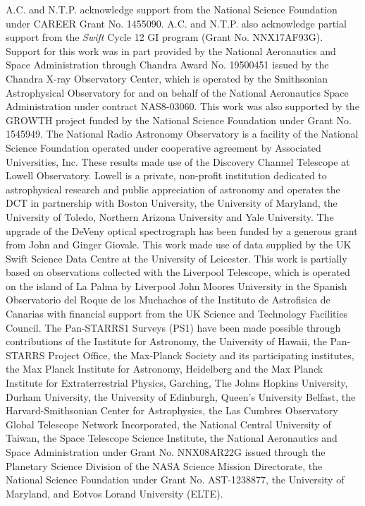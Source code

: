 \documentclass[twocolumn]{emulateapj}
\begin{document}
 
\acknowledgments \small
A.C. and N.T.P. acknowledge support from the National Science Foundation under CAREER Grant No. 1455090. A.C. and N.T.P. also acknowledge partial support from the 
\textit{Swift} Cycle 12 GI program (Grant No. NNX17AF93G). Support for this work was in part provided by 
the National Aeronautics and Space Administration through Chandra Award No. 19500451 issued 
by the Chandra X-ray Observatory Center, which is operated by the Smithsonian Astrophysical Observatory 
for and on behalf of the National Aeronautics Space Administration under contract NAS8-03060. 
This work was also supported by the GROWTH project funded by the National Science Foundation under Grant No. 1545949.
The National Radio Astronomy Observatory is a facility of the National Science Foundation 
operated under cooperative agreement by Associated Universities, Inc.
These results made use of the Discovery Channel Telescope 
at Lowell Observatory. Lowell is a private, non-profit institution 
dedicated to astrophysical research and public appreciation of astronomy 
and operates the DCT in partnership with Boston University, the University 
of Maryland, the University of Toledo, Northern Arizona University and 
Yale University.  The upgrade of the DeVeny optical spectrograph has been 
funded by a generous grant from John and Ginger Giovale.
This work made use of data supplied by the UK Swift Science Data Centre 
at the University of Leicester. This work is partially based on observations collected with the Liverpool Telescope, which is operated on the island of La Palma by Liverpool John Moores University in the Spanish Observatorio del Roque de los Muchachos of the Instituto de Astrofisica de Canarias with financial support from the UK Science and Technology Facilities Council.
The Pan-STARRS1 Surveys (PS1) have been made possible through contributions of the Institute for Astronomy, the University of Hawaii, the Pan-STARRS Project Office, the Max-Planck Society and its participating institutes, the Max Planck Institute for Astronomy, Heidelberg and the Max Planck Institute for Extraterrestrial Physics, Garching, The Johns Hopkins University, Durham University, the University of Edinburgh, Queen's University Belfast, the Harvard-Smithsonian Center for Astrophysics, the Las Cumbres Observatory Global Telescope Network Incorporated, the National Central University of Taiwan, the Space Telescope Science Institute, the National Aeronautics and Space Administration under Grant No. NNX08AR22G issued through the Planetary Science Division of the NASA Science Mission Directorate, the National Science Foundation under Grant No. AST-1238877, the University of Maryland, and Eotvos Lorand University (ELTE).
\end{document}
